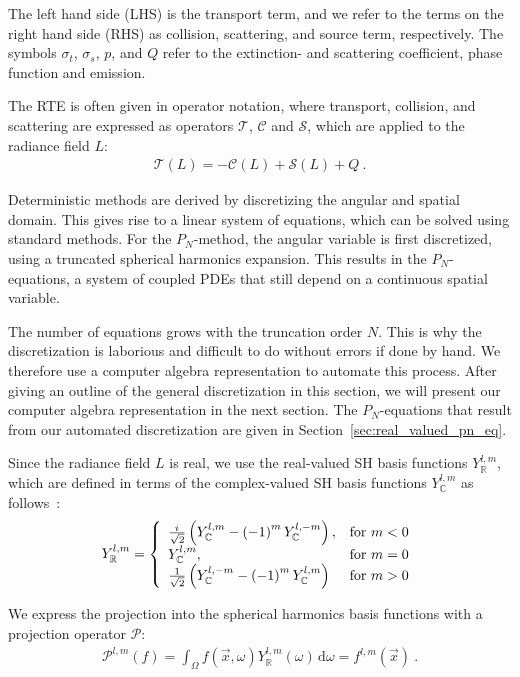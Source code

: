 \documentclass{egpubl}
\newcommand{\SHBR}{Y_{\mathbb{R}}} %
\newcommand{\SHBC}{Y_{\mathbb{C}}} %
\newcommand{\iu}{{i\mkern1mu}}
\begin{document}
The left hand side (LHS) is the transport term, and we refer to the terms on the right hand side (RHS) as collision, scattering, and source term, respectively. The symbols $\sigma_t$, $\sigma_s$, $p$, and $Q$ refer to the extinction- and scattering coefficient, phase function and emission.

The RTE is often given in operator notation, where transport, collision, and scattering are expressed as operators $\mathcal{T}$, $\mathcal{C}$ and $\mathcal{S}$, which are applied to the radiance field $L$:
\begin{align}
\mathcal{T}\left(L\right) = -\mathcal{C}\left(L\right) + \mathcal{S}\left(L\right) + Q
\ .
\end{align}

Deterministic methods are derived by discretizing the angular and spatial domain. This gives rise to a linear system of equations, which can be solved using standard methods. For the $P_N$-method, the angular variable is first discretized, using a truncated spherical harmonics expansion. This results in the $P_N$-equations, a system of coupled PDEs that still depend on a continuous spatial variable.

The number of equations grows with the truncation order $N$. This is why the discretization is laborious and difficult to do without errors if done by hand. We therefore use a computer algebra representation to automate this process. After giving an outline of the general discretization in this section, we will present our computer algebra representation in the next section. The $P_N$-equations that result from our automated discretization are given in Section~\ref{sec:real_valued_pn_eq}.

Since the radiance field $L$ is real, we use the real-valued SH basis functions $\SHBR^{l,m}$, which are defined in terms of the complex-valued SH basis functions $\SHBC^{l,m}$ as follows~\cite{Jarosz09}:
\begin{align}
\SHBR^{l,m}=
\left\{
\begin{array}{lr}
\frac{\iu}{\sqrt{2}}\left(\SHBC^{l,m}-\left(-1\right)^m\SHBC^{l,-m}\right), & \text{for } m < 0\\
\SHBC^{l,m}, & \text{for } m = 0\\
\frac{1}{\sqrt{2}}\left(\SHBC^{l,-m}-\left(-1\right)^m\SHBC^{l,m}\right) & \text{for } m > 0
\end{array}
\right.
\label{eq:sh_real_basis}
\end{align}

We express the projection into the spherical harmonics basis functions with a projection operator $\mathcal{P}$:
\begin{align}
\mathcal{P}^{l, m}(f) = \int_{\Omega}f(\vec{x}, \omega) \SHBR^{l,m}(\omega)\,\mathrm{d}\omega = f^{l,m}\left(\vec{x}\right)
\ .
\nonumber
\end{align}
\end{document}
